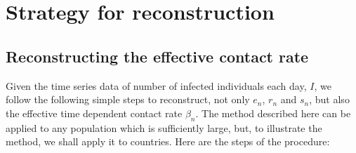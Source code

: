 \documentclass[aps,prd,10pt,twocolumn,nofootinbib]{revtex4-2}
\begin{document}
\section{Strategy for reconstruction}
\label{sec:strategy}

\subsection{Reconstructing the effective contact rate}

Given the time series data of number of infected individuals each day, $I$, we follow the following simple steps to reconstruct, not only $e_n$, $r_n$ and $s_n$, but also the effective time dependent contact rate $\beta_n$.
The method described here can be applied to any population which is sufficiently large, but, to illustrate the method, we shall apply it to countries. Here are the steps of the procedure:
\end{document}
